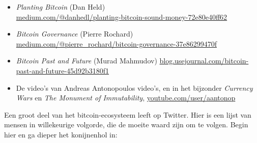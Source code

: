 \begin{itemize}
    \item \textit{Planting Bitcoin} (Dan Held)\\
    \href{https://medium.com/@danhedl/planting-bitcoin-sound-money-72e80e40ff62}{medium.com/@danhedl/planting-bitcoin-sound-money-72e80e40ff62}
    \item \textit{Bitcoin Governance} (Pierre Rochard)\\
    \href{https://medium.com/@pierre\_rochard/bitcoin-governance-37e86299470f}{medium.com/@pierre\_rochard/bitcoin-governance-37e86299470f}
    \item \textit{Bitcoin Past and Future} (Murad Mahmudov) \href{https://blog.usejournal.com/bitcoin-past-and-future-45d92b3180f1}{blog.usejournal.com/bitcoin-past-and-future-45d92b3180f1}
    \item De video's van Andreas Antonopoulos video's, en in het bijzonder \textit{Currency Wars} en \textit{The Monument of Immutability}, \href{https://www.youtube.com/user/aantonop}{youtube.com/user/aantonop}
\end{itemize}

Een groot deel van het bitcoin-ecosysteem leeft op Twitter. Hier is een lijst van mensen in willekeurige volgorde, die de moeite waard zijn om te volgen. Begin hier en ga dieper het konijnenhol in:

\newpage

